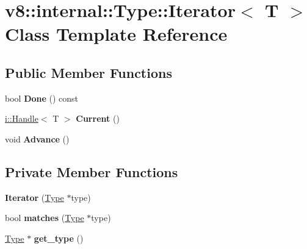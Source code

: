 \hypertarget{classv8_1_1internal_1_1_type_1_1_iterator}{}\section{v8\+:\+:internal\+:\+:Type\+:\+:Iterator$<$ T $>$ Class Template Reference}
\label{classv8_1_1internal_1_1_type_1_1_iterator}
\subsection*{Public Member Functions}
\begin{DoxyCompactItemize}
\item 
bool {\bfseries Done} () const \hypertarget{classv8_1_1internal_1_1_type_1_1_iterator_a648351ceea6673390a9d30e632214fd4}{}\label{classv8_1_1internal_1_1_type_1_1_iterator_a648351ceea6673390a9d30e632214fd4}

\item 
\hyperlink{classv8_1_1internal_1_1_handle}{i\+::\+Handle}$<$ T $>$ {\bfseries Current} ()\hypertarget{classv8_1_1internal_1_1_type_1_1_iterator_af6a182bb2c75d60500d6055148b4b1a8}{}\label{classv8_1_1internal_1_1_type_1_1_iterator_af6a182bb2c75d60500d6055148b4b1a8}

\item 
void {\bfseries Advance} ()\hypertarget{classv8_1_1internal_1_1_type_1_1_iterator_a8cdcfc0fd604addca19457937e9e7ab8}{}\label{classv8_1_1internal_1_1_type_1_1_iterator_a8cdcfc0fd604addca19457937e9e7ab8}

\end{DoxyCompactItemize}
\subsection*{Private Member Functions}
\begin{DoxyCompactItemize}
\item 
{\bfseries Iterator} (\hyperlink{classv8_1_1internal_1_1_type}{Type} $\ast$type)\hypertarget{classv8_1_1internal_1_1_type_1_1_iterator_a1895abe63399b84484b9c88addd81d2f}{}\label{classv8_1_1internal_1_1_type_1_1_iterator_a1895abe63399b84484b9c88addd81d2f}

\item 
bool {\bfseries matches} (\hyperlink{classv8_1_1internal_1_1_type}{Type} $\ast$type)\hypertarget{classv8_1_1internal_1_1_type_1_1_iterator_a9619746da1b28da1855e216a2ab9891f}{}\label{classv8_1_1internal_1_1_type_1_1_iterator_a9619746da1b28da1855e216a2ab9891f}

\item 
\hyperlink{classv8_1_1internal_1_1_type}{Type} $\ast$ {\bfseries get\+\_\+type} ()\hypertarget{classv8_1_1internal_1_1_type_1_1_iterator_a96466597f7799b6d1d4ab6ea7fb90383}{}\label{classv8_1_1internal_1_1_type_1_1_iterator_a96466597f7799b6d1d4ab6ea7fb90383}

\end{DoxyCompactItemize}
